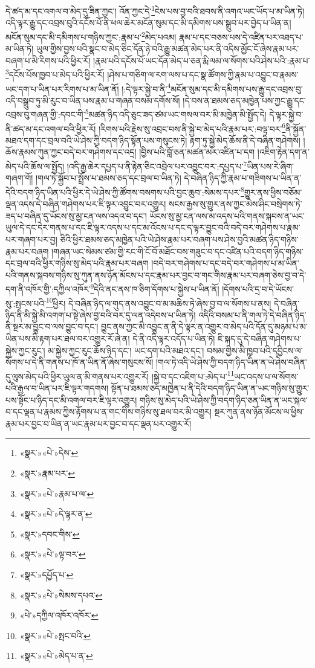 དེ་ཚད་མ་དང་འགལ་བ་མེད་དུ་ཟིན་ཀྱང་། འོན་ཀྱང་དེ་\footnote{«སྣར་»«པེ་»དེས་}ངེས་པས་བྱ་བའི་ཐབས་ནི་འགའ་ཡང་ཡོད་པ་མ་ཡིན་ཏེ། འདི་ལྟར་རྒྱུ་དང་འབྲས་བུའི་དངོས་པོ་ནི་ཕལ་ཆེར་མངོན་སུམ་དང་མི་དམིགས་པས་སྒྲུབ་པར་བྱེད་པ་ཡིན་ན། མངོན་སུམ་དང་མི་དམིགས་པ་གཉིས་ཀྱང་:རྣམ་པ་\footnote{«སྣར་»རྣམ་པར་}མེད་པའམ། རྣམ་པ་དང་བཅས་པས་དེ་འཛིན་པར་འཐད་པ་མ་ཡིན་ཏེ། ཡུལ་གྱིས་བྱས་པའི་སྣང་བ་མེད་ཅིང་དོན་ཉེ་བའི་རྒྱུ་མཚན་མེད་པར་ནི་འདིས་མྱོང་ངོ་ཞེས་རྣམ་པར་བཞག་པ་མི་རིགས་པའི་ཕྱིར་རོ། །རྣམ་པའི་དངོས་པོ་ཡང་དོན་མེད་པ་ཅན་རྨི་ལམ་ལ་སོགས་པའི་ཤེས་པའི་:རྣམ་པ་\footnote{«སྣར་»«པེ་»རྣམ་པ་ལ་}དངོས་པོས་ཁྱབ་པ་མེད་པའི་ཕྱིར་རོ། །ཤེས་པ་གཅིག་ལ་རག་ལས་པ་དང་སྣ་ཚོགས་ཀྱི་རྣམ་པ་འབྱུང་བ་རྣམས་ཡང་དག་པ་ཡིན་པར་རིགས་པ་མ་ཡིན་ནོ། །:དེ་ལྟར་སྐྱེ་བ་ནི་\footnote{«སྣར་»«པེ་»དེ་ལྟར་ན་}མངོན་སུམ་དང་མི་དམིགས་པས་རྒྱུ་དང་འབྲས་བུ་འདི་བསྒྲུབ་ཏུ་མི་རུང་བ་ཡིན་པས་རྣམ་པ་གཞན་བསམ་དགོས་སོ། །དེ་བས་ན་ཐམས་ཅད་མཁྱེན་པས་ཀྱང་རྒྱུ་དང་འབྲས་བུ་གཞན་གྱི་:དབང་གི་\footnote{«སྣར་»དབང་གིས་}མཚན་ཉིད་འདི་ཅུང་ཟད་ཙམ་ཡང་གསལ་བར་མི་མཁྱེན་མི་སྤྱོད་དེ། དེ་ལྟར་སྐྱེ་བ་ནི་ཚད་མ་དང་འགལ་བའི་ཕྱིར་རོ། །རིགས་པའི་རྗེས་སུ་འབྲང་བས་ནི་སྐྱེ་བ་མེད་པའི་རྣམ་པར་:བལྟ་བར་\footnote{«སྣར་»«པེ་»ལྟ་བར་}ནི་སྐྱོན་མཐའ་དག་དང་བྲལ་བའི་ཡེ་ཤེས་ཀྱི་བདག་ཉིད་སྟོན་པས་གསུངས་ཏེ། རྟག་ཏུ་སྐྱེ་མེད་ཆོས་ནི་དེ་བཞིན་གཤེགས། །ཆོས་རྣམས་ཀུན་ཀྱང་བདེ་བར་གཤེགས་དང་འདྲ། །བྱིས་པའི་བློ་ཅན་མཚན་མར་འཛིན་པ་དག །འཇིག་རྟེན་དག་ན་མེད་པའི་ཆོས་ལ་སྤྱོད། །འདི་རྒྱ་ཆེར་དཔྱད་པ་ནི་རྟེན་ཅིང་འབྲེལ་པར་འབྱུང་བར་:དཔྱད་པ་\footnote{«སྣར་»དཔྱོད་པ་}ཡིན་པས་རེ་ཞིག་གཞག་གོ། །གལ་ཏེ་སྐྱོབ་པ་སྤྲོས་པ་ཐམས་ཅད་དང་བྲལ་བ་ཡིན་ཏེ། དེ་བཞིན་ཉིད་ཀྱི་རྣམ་པ་གཟིགས་པ་ཡིན་ན་དེའི་བདག་ཉིད་ཡིན་པའི་ཕྱིར་དེ་ཡེ་ཤེས་ཀྱི་ཚོགས་བསགས་པའི་བྱང་ཆུབ་:སེམས་དཔར་\footnote{«སྣར་»«པེ་»སེམས་དཔའ་}གྱུར་ནས་ཕྱིས་བཅོམ་ལྡན་འདས་དེ་བཞིན་གཤེགས་པར་ཇི་ལྟར་འབྱུང་བར་འགྱུར། སངས་རྒྱས་སུ་གྱུར་ནས་ཀྱང་མེས་ཤིང་བསྲེགས་ཏེ་ཟད་པ་བཞིན་དུ་ཡོངས་སུ་མྱ་ངན་ལས་འདའ་བ་དང་། ཡོངས་སུ་མྱ་ངན་ལས་མ་འདས་པའི་གནས་སྐབས་ན་ཡང་ཡུལ་དེ་དང་དེར་གནས་པ་དང་ཇི་ལྟར་འདས་པ་དང་མ་འོངས་པ་དང་ད་ལྟར་བྱུང་བའི་བདེ་བར་གཤེགས་པ་རྣམ་པར་གཞག་པར་བྱ། ཅིའི་ཕྱིར་ཐམས་ཅད་མཁྱེན་པའི་ཡེ་ཤེས་རྣམ་པར་བཞག་པས་ཤེས་བྱའི་མཚན་ཉིད་གཉིས་རྣམ་པར་བཞག །གཞན་ཡང་སེམས་ཙམ་གྱི་རང་གི་ངོ་བོ་མཐོང་བས་གཟུང་བ་དང་འཛིན་པའི་བདག་ཉིད་གཉིས་དང་བྲལ་བའི་ཕྱིར་གཉིས་སུ་མེད་པའི་རྣམ་པར་བཞག །བདེ་བར་གཤེགས་པ་དང་བདེ་བར་གཤེགས་པ་མ་ཡིན་པའི་གནས་སྐབས་གཉིས་སུ་ཀུན་ནས་ཉོན་མོངས་པ་དང་རྣམ་པར་བྱང་བ་གང་གིས་རྣམ་པར་བཞག་ཅེས་བྱ་བ་དེ་དག་ནི་འཁོར་གྱི་:དཀྱིལ་འཁོར་\footnote{«པེ་»དཀྱིལ་འཁོར་འཁོར་}དེའི་ནང་ནས་ཁ་ཅིག་དོགས་པ་སྐྱེས་པ་ཡིན་ནོ། །དོགས་པའི་དྲ་བ་དེ་ཡོངས་སུ་:སྤངས་པའི་\footnote{«སྣར་»«པེ་»སྤང་བའི་}ཕྱིར། དེ་བཞིན་ཉིད་ལ་གུད་ནས་འབྱུང་བ་མ་མཆིས་ཏེ་ཞེས་བྱ་བ་ལ་སོགས་པ་ནས། དེ་བཞིན་ཉིད་ནི་མི་སྐྱེ་མི་འགག་པ་སྟེ་ཞེས་བྱ་བའི་བར་དུ་ལན་འདེབས་པ་ཡིན་ཏེ། འདིའི་བསམ་པ་ནི་གལ་ཏེ་དེ་བཞིན་ཉིད་ནི་སྔར་མ་བྱུང་བ་ལས་བྱུང་བ་དང་། བྱུང་ནས་ཀྱང་མི་འབྱུང་ན་ནི་དེ་ལྟར་ན་འགྱུར་བ་མེད་པའི་དོན་དུ་མཉམ་པ་མ་ཡིན་པས་མི་རྟག་པར་ཐལ་བར་འགྱུར་རོ་ཞེ་ན། དེ་ནི་འདི་ལྟར་འདོད་པ་ཡིན་ཏེ། ཇི་སྐད་དུ་དེ་བཞིན་གཤེགས་པ་སྐྱེས་ཀྱང་རུང་། མ་སྐྱེས་ཀྱང་རུང་ཆོས་ཉིད་དང་། ཡང་དག་པའི་མཐའ་དང་། བསམ་གྱིས་མི་ཁྱབ་པའི་དབྱིངས་ལ་སོགས་པ་དེ་ནི་གནས་པ་ཁོ་ན་ཡིན་ནོ་ཞེས་གསུངས་སོ། །གལ་ཏེ་འདི་ཡེ་ཤེས་ཀྱི་བདག་ཉིད་ཡིན་ན་ཡེ་ཤེས་བཞིན་དུ་ལུས་མེད་པའི་ཕྱིར་ཡུལ་ན་མི་གནས་པར་འགྱུར་རོ། །སྐྱེ་བ་དང་འཇིག་པ་:མེད་པ་\footnote{«སྣར་»«པེ་»མེད་པ་ན་}ཡང་འདས་པ་ལ་སོགས་པའི་རྒྱལ་བ་ཡིན་པར་ཇི་ལྟར་གདགས། སྟོན་པ་ཐམས་ཅད་མཁྱེན་པ་ནི་དེའི་བདག་ཉིད་ཡིན་ན་ཡང་གཉིས་སུ་གྱུར་པས་སྟོང་པ་ཉིད་དང་མི་འགལ་བར་ཇི་ལྟར་འགྱུར། གཉིས་སུ་མེད་པའི་ཡེ་ཤེས་ཀྱི་བདག་ཉིད་ཅན་ཡིན་ན་ཡང་སྐལ་བ་དང་ལྡན་པ་རྣམས་ཀྱིས་རྟོགས་པ་ན་གང་གིས་གཉིས་སུ་ཐལ་བར་མི་འགྱུར། སྔར་ཀུན་ནས་ཉོན་མོངས་ལ་ཕྱིས་རྣམ་པར་བྱང་བ་ཡིན་ན་ཡང་རྣམ་པར་བྱང་བ་དང་ལྡན་པར་འགྱུར་རོ། 